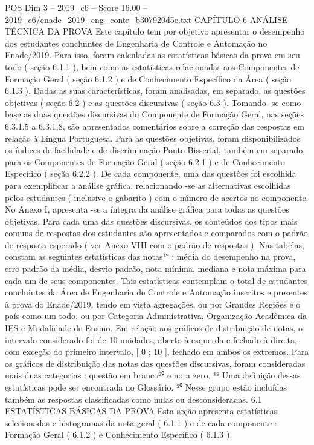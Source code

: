 \begin{textsample}{POS Dim 3 – 2019\_c6 – Score 16.00 – 2019\_c6/enade\_2019\_eng\_contr\_b307920d5e.txt}  \label{ex:f3_pos_018}
CAPÍTULO 6 ANÁLISE TÉCNICA DA PROVA Este capítulo tem por objetivo apresentar o desempenho dos estudantes concluintes de Engenharia de Controle e Automação no Enade/2019.
Para isso, foram calculadas as estatísticas básicas da prova em seu todo ( seção 6.1.1 ), bem como as estatísticas relacionadas aos Componentes de Formação Geral ( seção 6.1.2 ) e de Conhecimento Específico da Área ( seção 6.1.3 ).
Dadas as suas características, foram analisadas, em separado, as questões objetivas ( seção 6.2 ) e as questões discursivas ( seção 6.3 ).
Tomando -se como base as duas questões discursivas do Componente de Formação Geral, nas seções 6.3.1.5 a 6.3.1.8, são apresentados comentários sobre a correção das respostas em relação à Língua Portuguesa.
Para as questões objetivas, foram disponibilizados os índices de facilidade e de discriminação Ponto-Bisserial, também em separado, para os Componentes de Formação Geral ( seção 6.2.1 ) e de Conhecimento Específico ( seção 6.2.2 ).
De cada componente, uma das questões foi escolhida para exemplificar a análise gráfica, relacionando -se as alternativas escolhidas pelos estudantes ( inclusive o gabarito ) com o número de acertos no componente.
No Anexo I, apresenta -se a íntegra da análise gráfica para todas as questões objetivas.
Para cada uma das questões discursivas, os conteúdos dos tipos mais comuns de respostas dos estudantes são apresentados e comparados com o padrão de resposta esperado ( ver Anexo VIII com o padrão de respostas ).
Nas tabelas, constam as seguintes estatísticas das notas¹⁹ : média do desempenho na prova, erro padrão da média, desvio padrão, nota mínima, mediana e nota máxima para cada um de seus componentes.
Tais estatísticas contemplam o total de estudantes concluintes da Área de Engenharia de Controle e Automação inscritos e presentes à prova do Enade/2019, tendo em vista agregações, ou por Grandes Regiões e o país como um todo, ou por Categoria Administrativa, Organização Acadêmica da IES e Modalidade de Ensino.
Em relação aos gráficos de distribuição de notas, o intervalo considerado foi de 10 unidades, aberto à esquerda e fechado à direita, com exceção do primeiro intervalo, [ 0 ; 10 ], fechado em ambos os extremos.
Para os gráficos de distribuição das notas das questões discursivas, foram consideradas mais duas categorias : questão em branco²⁰ e nota zero. ¹⁹ Uma definição dessas estatísticas pode ser encontrada no Glossário. ²⁰ Nesse grupo estão incluídas também as respostas classificadas como nulas ou desconsideradas. 6.1 ESTATÍSTICAS BÁSICAS DA PROVA Esta seção apresenta estatísticas selecionadas e histogramas da nota geral ( 6.1.1 ) e de cada componente : Formação Geral ( 6.1.2 ) e Conhecimento Específico ( 6.1.3 ).

\end{textsample}
